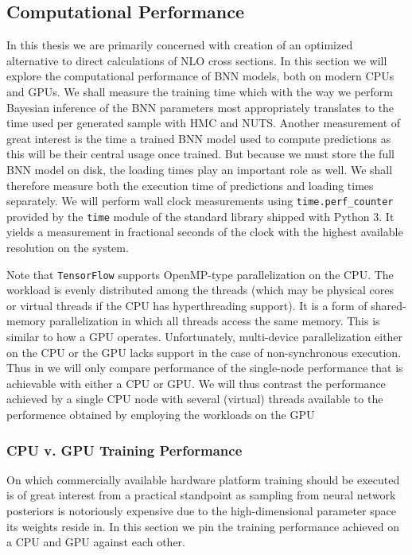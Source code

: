 \subsection{Computational Performance}
In this thesis we are primarily concerned with creation of an optimized alternative to direct calculations of NLO cross sections.
In this section we will explore the computational performance of BNN models, both on modern CPUs and GPUs. We shall measure the training time which with the way we perform Bayesian inference of the BNN parameters most appropriately translates to the time used per generated sample with HMC and NUTS. Another measurement of great interest is the time a trained BNN model used to compute predictions as this will be their central usage once trained. But because we must store the full BNN model on disk, the loading times play an important role as well. We shall therefore measure both the execution time of predictions and loading times separately.
We will perform wall clock measurements using {\tt time.perf\_counter} provided by the {\tt time} module of the standard library shipped with Python 3. It yields a measurement in fractional seconds of the clock with the highest available resolution on the system.

Note that {\tt TensorFlow} supports OpenMP-type parallelization on the CPU. The workload is evenly distributed among the threads (which may be physical cores or virtual threads if the CPU has hyperthreading support). It is a form of shared-memory parallelization in which all threads access the same memory. This is similar to how a GPU operates.
Unfortunately, multi-device parallelization either on the CPU or the GPU lacks support in the case of non-synchronous execution. Thus in we will only compare performance of the single-node performance that is achievable with either a CPU or GPU. We will thus contrast the performance achieved by a single CPU node with several (virtual) threads available to the performence obtained by employing the workloads on the GPU

\subsubsection{CPU v. GPU Training Performance}
On which commercially available hardware platform training should be executed is of great interest from a practical standpoint as 
sampling from neural network posteriors is notoriously expensive due to the high-dimensional parameter space its weights reside in.
In this section we pin the training performance achieved on a CPU and GPU against each other.

